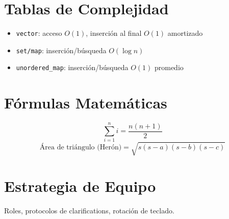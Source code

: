 \documentclass[11pt,a4paper]{article}
\begin{document}
\section{Tablas de Complejidad}
\begin{itemize}
  \item \texttt{vector}: acceso $O(1)$, inserción al final $O(1)$ amortizado
  \item \texttt{set/map}: inserción/búsqueda $O(\log n)$
  \item \texttt{unordered\_map}: inserción/búsqueda $O(1)$ promedio
\end{itemize}

\section{Fórmulas Matemáticas}
\[
\sum_{i=1}^n i = \frac{n(n+1)}{2}
\]
\[
\text{Área de triángulo (Herón)} = \sqrt{s(s-a)(s-b)(s-c)}
\]

\section{Estrategia de Equipo}
Roles, protocolos de clarifications, rotación de teclado.
\end{document}
